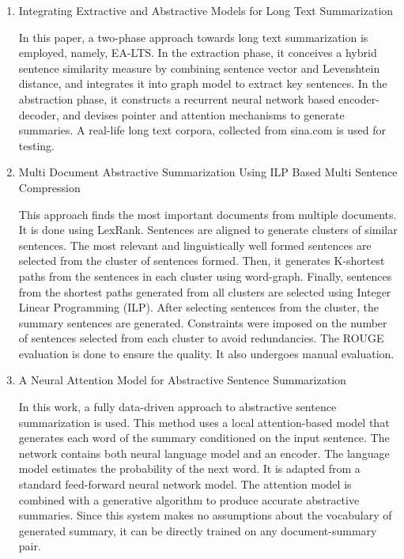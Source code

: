 \documentclass[11pt]{report}
\begin{document}
\begin{enumerate}
    \item Integrating Extractive and Abstractive Models for Long Text Summarization\cite{11}

    In this paper, a two-phase approach towards long text summarization is employed, namely, EA-LTS. In the extraction phase, it conceives a hybrid sentence similarity measure by combining sentence vector and Levenshtein distance, and integrates it into graph model to extract key sentences. In the abstraction phase, it constructs a recurrent neural network based encoder-decoder, and devises pointer and attention mechanisms to generate summaries. A real-life long text corpora, collected from sina.com is used for testing.\\

    \item Multi Document Abstractive Summarization Using ILP Based Multi Sentence Compression\cite{12}

    This approach finds the most important documents from multiple documents. It is done using LexRank. Sentences are aligned to generate clusters of similar sentences. The most relevant and linguistically well formed sentences are selected from the cluster of sentences formed.  Then, it generates K-shortest paths from the sentences in each cluster using word-graph. Finally, sentences from the shortest paths generated from all clusters are selected using Integer Linear Programming (ILP). After selecting sentences from the cluster, the summary sentences are generated. Constraints were imposed on the number of sentences selected from each cluster to avoid redundancies. The ROUGE evaluation is done to ensure the quality. It also undergoes manual evaluation.\\ 

    \item A Neural Attention Model for Abstractive Sentence Summarization\cite{13}

    In this work, a fully data-driven approach to abstractive sentence summarization is used. This method uses a local attention-based model that generates each word of the summary conditioned on the input sentence. The network contains both neural language model and an encoder. The language model estimates the probability of the next word. It is adapted from a standard feed-forward neural network model. The attention model is combined with a generative algorithm to produce accurate abstractive summaries. Since this system makes no assumptions about the vocabulary of generated summary, it can be directly trained on any document-summary pair.\\
    

\end{enumerate}
\end{document}
